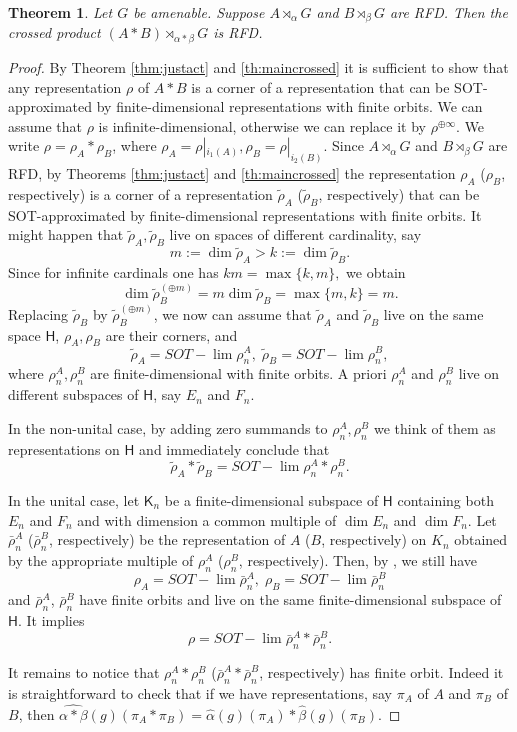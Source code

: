 \documentclass[11 pt, leqno, hidelinks]{amsart}%
\newtheorem{theorem}{Theorem}[section]
\theoremstyle{plain}
\numberwithin{equation}{section}
\newcommand{\Hil}{\mathsf{H}}
\newcommand{\Kil}{\mathsf{K}}
\begin{document}
\begin{theorem}\label{FreeProductAction} Let $G$ be amenable. Suppose $A\rtimes_{\alpha} G$ and $B\rtimes_{\beta} G$ are RFD. Then the crossed product $(A\ast B)\rtimes_{\alpha\ast \beta} G$ is RFD.
\end{theorem}
\begin{proof} By Theorem \ref{thm:justact} and \ref{th:maincrossed} it is sufficient to show that any representation $\rho$ of $A\ast B$ is a corner of a representation that can be  SOT-approximated by finite-dimensional representations with finite orbits. We can assume that $\rho$ is infinite-dimensional, otherwise we can replace it by $\rho^{\oplus \infty}$.  We write $\rho = \rho_A \ast \rho_B$, where $\rho_A = \rho|_{i_1(A)}, \rho_B = \rho|_{i_2(B)}.$   Since $A\rtimes_{\alpha} G$ and $B\rtimes_{\beta} G$ are RFD, by Theorems \ref{thm:justact} and \ref{th:maincrossed} the representation $\rho_A$ ($\rho_B$, respectively)
is a corner of a representation $\tilde \rho_A$ ($\tilde\rho_B$, respectively) that can be SOT-approximated by finite-dimensional representations with finite orbits. It might happen that $\tilde \rho_A, \tilde \rho_B$ live on spaces of different cardinality, say
$$m:= \dim \tilde \rho_A  > k:= \dim \tilde \rho_B.$$
Since for infinite cardinals one has $km = \max\{k, m\},$ we obtain
$$
\dim \tilde\rho_B^{(\oplus m)} = m \dim \tilde\rho_B = \max\{m, k\} = m.$$
Replacing $\tilde\rho_B$ by $\tilde\rho_B^{(\oplus m)}$, we now can assume that $\tilde \rho_A$ and $\tilde \rho_B$ live on the same space $\Hil$, $\rho_A, \rho_B$ are their corners, and
$$\tilde\rho_A = SOT-\lim \rho_n^A, \; \tilde \rho_B = SOT-\lim \rho_n^B,$$
where $\rho_n^A, \rho_n^B$ are finite-dimensional with finite orbits. A priori $\rho_n^A$ and $ \rho_n^B$ live on different subspaces of $\Hil$, say $E_n$ and $F_n$.

In the non-unital case, by adding zero summands to  $\rho_n^A, \rho_n^B$ we think of them as representations on $\Hil$ and immediately conclude that
$$\tilde\rho_A \ast \tilde\rho_B = SOT-\lim \rho_n^A \ast \rho_n^B.$$

In the unital case, let $\Kil_n$ be a finite-dimensional subspace of $\Hil$ containing both $E_n$ and $F_n$ and with dimension a common multiple of $\dim E_n$ and $\dim F_n$. Let $\bar\rho_n^A$ ($\bar\rho_n^B$, respectively) be the representation of $A$ ($B$, respectively) on $K_n$ obtained by the appropriate multiple of $\rho_n^A$ ($\rho_n^B$, respectively). Then, by \cite[Lemma 3.1]{ExelLoring},  we still have \begin{equation}\label{1} \rho_A = SOT-\lim \bar\rho_n^A, \; \rho_B = SOT-\lim \bar\rho_n^B\end{equation} and $\bar\rho_n^A$, $\bar\rho_n^B$ have finite orbits and live on the same finite-dimensional subspace of $\Hil$. It implies
$$\rho = SOT-\lim \bar\rho_n^A \ast \bar\rho_n^B.$$

It remains to notice that $\rho_n^A \ast \rho_n^B$ ($\bar\rho_n^A \ast \bar\rho_n^B$, respectively) has finite orbit.
Indeed it is straightforward to check that if we have representations, say $\pi_A$ of $A$ and $\pi_B$ of $B$, then $\hat{\alpha\ast\beta}(g)(\pi_A\ast \pi_B) = \hat \alpha(g)(\pi_A)\ast \hat\beta(g)(\pi_B)$.
\end{proof}
\end{document}
